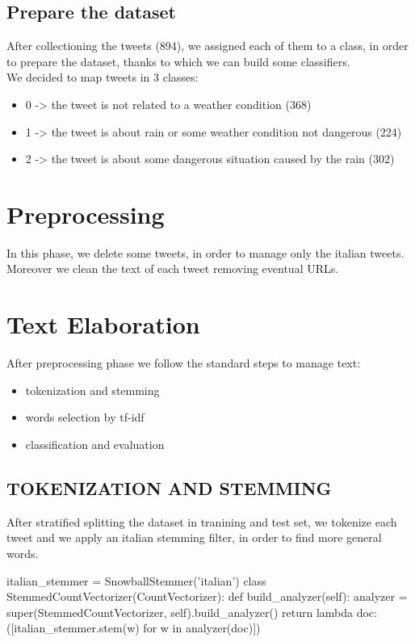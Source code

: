 \documentclass[a4paper]{article}
\begin{document}
\subsection{Prepare the dataset}
After collectioning the tweets (894), we assigned each of them to a class, in order to prepare the dataset, thanks to which we can build some classifiers.\\
We decided to map tweets in 3 classes:
\begin{itemize}
\item 0 -> the tweet is not related to a weather condition (368)
\item 1 -> the tweet is about rain or some weather condition not dangerous (224)
\item 2 -> the tweet is about some dangerous situation caused by the rain (302)
\end{itemize}

\section{Preprocessing}
In this phase, we delete some tweets, in order to manage only the italian tweets.\\
Moreover we clean the text of each tweet removing eventual URLs.

\section{Text Elaboration}
After preprocessing phase we follow the standard steps to manage text:
\begin{itemize}
\item tokenization and stemming
\item words selection by tf-idf
\item classification and evaluation
\end{itemize}

\subsection{TOKENIZATION AND STEMMING}
    After stratified splitting the dataset in tranining and test set, we tokenize each tweet and we apply an italian stemming filter, in order to find more general words.
    
        italian_stemmer = SnowballStemmer('italian')
        class StemmedCountVectorizer(CountVectorizer):
            def build_analyzer(self):
                analyzer = super(StemmedCountVectorizer, self).build_analyzer()
                return lambda doc: ([italian_stemmer.stem(w) for w in analyzer(doc)])
\end{document}
